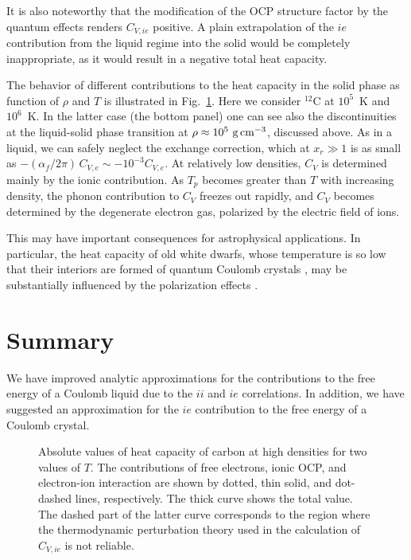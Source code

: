 It is also noteworthy that the modification of the OCP
structure factor by the quantum effects 
renders $C_{V,ie}$ positive. 
A plain extrapolation of the $ie$ contribution from the 
liquid regime into the solid would be completely inappropriate,
as it would result in a negative total heat capacity.

The behavior of different contributions to the heat capacity
in the solid phase as function of $\rho$ and $T$
is illustrated in Fig.~\ref{fig-cv06sol}.
Here we consider $^{12}$C at $10^5$~K
and $10^6$~K. In the latter case (the bottom panel)
one can see also the discontinuities
at the liquid-solid phase transition at $\rho\approx10^5{\rm~g\,cm}^{-3}$,
discussed above. 
As in a liquid, we can safely neglect 
the exchange correction, which at $x_r\gg1$ is as small as
$-(\alpha_f/2\pi)\,C_{V,e}\sim -10^{-3}C_{V,e}$.
At relatively low densities, $C_V$ is determined mainly by the ionic
contribution.
As $T_p$ becomes greater than $T$ with increasing density,
the phonon contribution to $C_V$ freezes out rapidly,
and $C_V$ becomes determined by the degenerate electron gas,
polarized by the electric field of ions.

This may have important consequences for astrophysical applications.
In particular, the heat capacity of old white dwarfs,
whose temperature is so low that their interiors
are formed of quantum Coulomb crystals \cite{WD}, may be 
substantially influenced by the polarization effects \cite{Chabrier00}.

\section{Summary}
%
We have improved analytic approximations \cite{CP98} 
for the contributions to the free energy of a Coulomb 
liquid due to the $ii$ and $ie$ correlations.
In addition, we have 
suggested an approximation for the $ie$ contribution
to the free energy of a Coulomb crystal. 


\begin{figure}
    \begin{center}
    \leavevmode
    \epsfxsize=86mm
    \end{center}
\caption{
Absolute values of heat capacity of carbon at high densities
for two values of $T$. The contributions
of free electrons, ionic OCP, and electron-ion
interaction are shown by dotted, thin solid,
and dot-dashed lines, respectively.
The thick curve shows the total value.
The dashed part of the latter curve corresponds to the region
where the thermodynamic perturbation theory used in the calculation
of $C_{V,ie}$ is not reliable.
}
\label{fig-cv06sol}
\end{figure}


